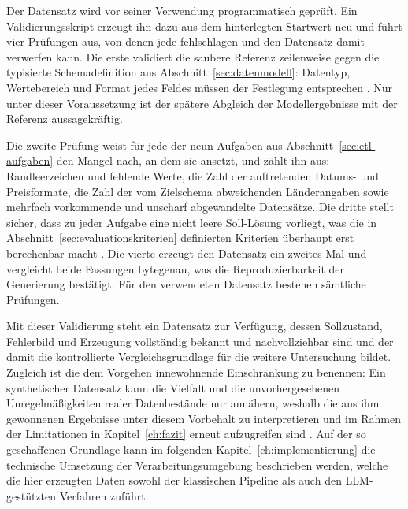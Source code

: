 Der Datensatz wird vor seiner Verwendung programmatisch geprüft. Ein Validierungsskript erzeugt ihn dazu aus dem hinterlegten Startwert neu und führt vier Prüfungen aus, von denen jede fehlschlagen und den Datensatz damit verwerfen kann. Die erste validiert die saubere Referenz zeilenweise gegen die typisierte Schemadefinition aus Abschnitt~\ref{sec:datenmodell}: Datentyp, Wertebereich und Format jedes Feldes müssen der Festlegung entsprechen \autocite{ridzuanReviewDataQuality2024,rangineniReviewEnhancingData2023}. Nur unter dieser Voraussetzung ist der spätere Abgleich der Modellergebnisse mit der Referenz aussagekräftig.

Die zweite Prüfung weist für jede der neun Aufgaben aus Abschnitt~\ref{sec:etl-aufgaben} den Mangel nach, an dem sie ansetzt, und zählt ihn aus: Randleerzeichen und fehlende Werte, die Zahl der auftretenden Datums- und Preisformate, die Zahl der vom Zielschema abweichenden Länderangaben sowie mehrfach vorkommende und unscharf abgewandelte Datensätze. Die dritte stellt sicher, dass zu jeder Aufgabe eine nicht leere Soll-Lösung vorliegt, was die in Abschnitt~\ref{sec:evaluationskriterien} definierten Kriterien überhaupt erst berechenbar macht \autocite{coteDataCleaningMachine2024}. Die vierte erzeugt den Datensatz ein zweites Mal und vergleicht beide Fassungen bytegenau, was die Reproduzierbarkeit der Generierung bestätigt. Für den verwendeten Datensatz bestehen sämtliche Prüfungen.

Mit dieser Validierung steht ein Datensatz zur Verfügung, dessen Sollzustand, Fehlerbild und Erzeugung vollständig bekannt und nachvollziehbar sind und der damit die kontrollierte Vergleichsgrundlage für die weitere Untersuchung bildet. Zugleich ist die dem Vorgehen innewohnende Einschränkung zu benennen: Ein synthetischer Datensatz kann die Vielfalt und die unvorhergesehenen Unregelmäßigkeiten realer Datenbestände nur annähern, weshalb die aus ihm gewonnenen Ergebnisse unter diesem Vorbehalt zu interpretieren und im Rahmen der Limitationen in Kapitel~\ref{ch:fazit} erneut aufzugreifen sind \autocite{liSyntheticDataGeneration2023,goyalSystematicReviewSynthetic2024}. Auf der so geschaffenen Grundlage kann im folgenden Kapitel~\ref{ch:implementierung} die technische Umsetzung der Verarbeitungsumgebung beschrieben werden, welche die hier erzeugten Daten sowohl der klassischen Pipeline als auch den \ac{LLM}-gestützten Verfahren zuführt.
